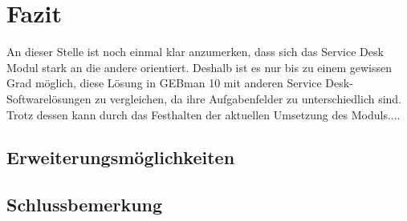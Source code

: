 \section{Fazit}


An dieser Stelle ist noch einmal klar anzumerken, dass sich das Service Desk Modul stark an die andere orientiert. Deshalb ist es nur bis zu einem gewissen Grad möglich, diese Lösung in GEBman 10 mit anderen Service Desk-Softwarelösungen zu vergleichen, da ihre Aufgabenfelder zu unterschiedlich sind. Trotz dessen kann durch das Festhalten der aktuellen Umsetzung des Moduls....


\subsection{Erweiterungsmöglichkeiten}
\subsection{Schlussbemerkung}